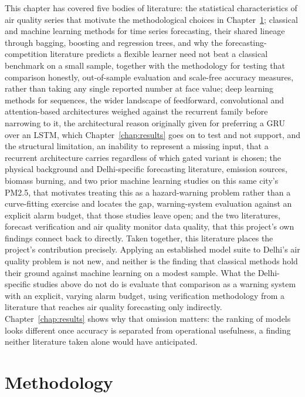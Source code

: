\documentclass[12pt,a4paper]{report}
\begin{document}
This chapter has covered five bodies of literature: the statistical
characteristics of air quality series that motivate the methodological
choices in Chapter~\ref{chap:method}; classical and machine learning methods
for time series forecasting, their shared lineage through bagging, boosting
and regression trees, and why the forecasting-competition literature
predicts a flexible learner need not beat a classical benchmark on a small
sample, together with the methodology for testing that comparison honestly,
out-of-sample evaluation and scale-free accuracy measures, rather than
taking any single reported number at face value; deep learning methods for
sequences, the wider landscape of feedforward, convolutional and
attention-based architectures weighed against the recurrent family before
narrowing to it, the architectural reason originally given for preferring
a GRU over an LSTM, which Chapter~\ref{chap:results} goes on to test and
not support, and the structural limitation, an inability
to represent a missing input, that a recurrent architecture carries
regardless of which gated variant is chosen; the physical background and
Delhi-specific forecasting literature, emission sources, biomass burning,
and two prior machine learning studies on this same city's PM2.5, that
motivates treating this as a hazard-warning problem rather than a
curve-fitting exercise and locates the gap, warning-system evaluation
against an explicit alarm budget, that those studies leave open; and the
two literatures, forecast
verification and air quality monitor data quality, that this project's own
findings connect back to directly. Taken together, this literature places
the project's contribution precisely. Applying an established model suite to
Delhi's air quality problem is not new, and neither is the finding that
classical methods hold their ground against machine learning on a modest
sample. What the Delhi-specific studies above do not do is evaluate that
comparison as a warning system with an explicit, varying alarm budget, using
verification methodology from a literature that reaches air quality
forecasting only indirectly. Chapter~\ref{chap:results} shows why that
omission matters: the ranking of models looks different once accuracy is
separated from operational usefulness, a finding neither literature taken
alone would have anticipated.

\chapter{Methodology}
\label{chap:method}
\end{document}
